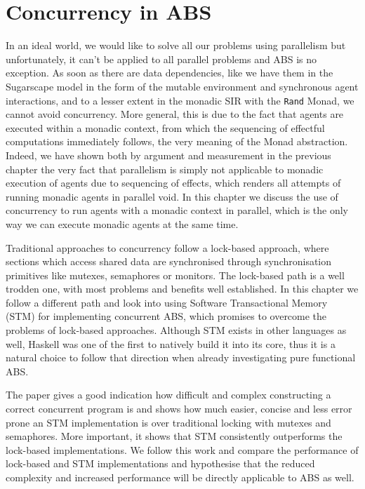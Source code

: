 \chapter{Concurrency in ABS}
\label{ch:concurrent_abs}
In an ideal world, we would like to solve all our problems using parallelism but unfortunately, it can't be applied to all parallel problems and ABS is no exception. As soon as there are data dependencies, like we have them in the Sugarscape model in the form of the mutable environment and synchronous agent interactions, and to a lesser extent in the monadic SIR with the \texttt{Rand} Monad, we cannot avoid concurrency. More general, this is due to the fact that agents are executed within a monadic context, from which the  sequencing of effectful computations immediately follows, the very meaning of the Monad abstraction. Indeed, we have shown both by argument and measurement in the previous chapter the very fact that parallelism is simply not applicable to monadic execution of agents due to sequencing of effects, which renders all attempts of running monadic agents in parallel void. In this chapter we discuss the use of concurrency to run agents with a monadic context in parallel, which is the only way we can execute monadic agents at the same time.

\medskip

Traditional approaches to concurrency follow a lock-based approach, where sections which access shared data are synchronised through synchronisation primitives like mutexes, semaphores or monitors. The lock-based path is a well trodden one, with most problems and benefits well established. In this chapter we follow a different path and look into using Software Transactional Memory (STM) for implementing concurrent ABS, which promises to overcome the problems of lock-based approaches. Although STM exists in other languages as well, Haskell was one of the first to natively build it into its core, thus it is a natural choice to follow that direction when already investigating pure functional ABS.

The paper \cite{discolo_lock_2006} gives a good indication how difficult and complex constructing a correct concurrent program is and shows how much easier, concise and less error prone an STM implementation is over traditional locking with mutexes and semaphores. More important, it shows that STM consistently outperforms the lock-based implementations. We follow this work and compare the performance of lock-based and STM implementations and hypothesise that the reduced complexity and increased performance will be directly applicable to ABS as well.

